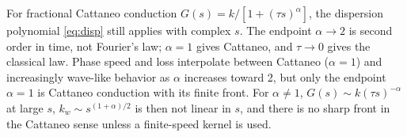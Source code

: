 \begin{summarybox}[Summary]
For fractional Cattaneo conduction $G(s)=k/[1+(\tau s)^\alpha]$, the dispersion polynomial \eqref{eq:disp} still applies with complex $s$. The endpoint $\alpha\to2$ is second order in time, not Fourier's law; $\alpha=1$ gives Cattaneo, and $\tau\to0$ gives the classical law. Phase speed and loss interpolate between Cattaneo ($\alpha=1$) and increasingly wave-like behavior as $\alpha$ increases toward 2, but only the endpoint $\alpha=1$ is Cattaneo conduction with its finite front. For $\alpha\ne1$, $G(s)\sim k(\tau s)^{-\alpha}$ at large $s$, $k_w\sim s^{(1+\alpha)/2}$ is then not linear in $s$, and there is no sharp front in the Cattaneo sense unless a finite-speed kernel is used.
\end{summarybox}
